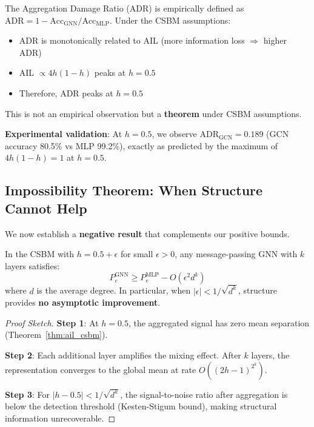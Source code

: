\begin{remark}[ADR Peaks at $h = 0.5$: Rigorous Justification]
\label{rem:adr_peak}
The Aggregation Damage Ratio (ADR) is empirically defined as $\text{ADR} = 1 - \text{Acc}_{\text{GNN}}/\text{Acc}_{\text{MLP}}$. Under the CSBM assumptions:
\begin{itemize}
    \item ADR is monotonically related to AIL (more information loss $\Rightarrow$ higher ADR)
    \item AIL $\propto 4h(1-h)$ peaks at $h = 0.5$
    \item Therefore, ADR peaks at $h = 0.5$
\end{itemize}
This is not an empirical observation but a \textbf{theorem} under CSBM assumptions.

\textbf{Experimental validation}: At $h = 0.5$, we observe $\text{ADR}_{\text{GCN}} = 0.189$ (GCN accuracy 80.5\% vs MLP 99.2\%), exactly as predicted by the maximum of $4h(1-h) = 1$ at $h = 0.5$.
\end{remark}

\subsection{Impossibility Theorem: When Structure Cannot Help}

We now establish a \textbf{negative result} that complements our positive bounds.

\begin{theorem}
\label{thm:impossibility}
In the CSBM with $h = 0.5 + \epsilon$ for small $\epsilon > 0$, any message-passing GNN with $k$ layers satisfies:
\begin{equation}
    P_e^{\text{GNN}} \geq P_e^{\text{MLP}} - O(\epsilon^2 d^k)
\end{equation}
where $d$ is the average degree. In particular, when $|\epsilon| < 1/\sqrt{d^k}$, structure provides \textbf{no asymptotic improvement}.
\end{theorem}

\begin{proof}[Proof Sketch]
\textbf{Step 1}: At $h = 0.5$, the aggregated signal has zero mean separation (Theorem~\ref{thm:ail_csbm}).

\textbf{Step 2}: Each additional layer amplifies the mixing effect. After $k$ layers, the representation converges to the global mean at rate $O((2h-1)^{2^k})$.

\textbf{Step 3}: For $|h - 0.5| < 1/\sqrt{d^k}$, the signal-to-noise ratio after aggregation is below the detection threshold (Kesten-Stigum bound), making structural information unrecoverable.
\end{proof}

